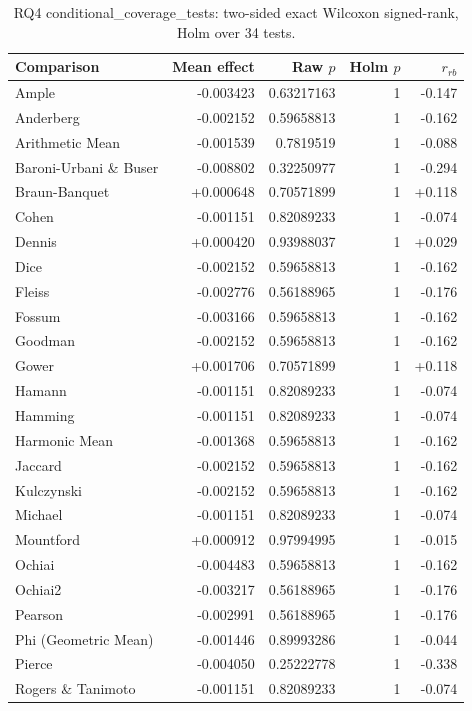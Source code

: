 \begin{longtable}{lrrrr}
\caption{RQ4 conditional\_coverage\_tests: two-sided exact Wilcoxon signed-rank, Holm over 34 tests.}\\
\toprule
Comparison & Mean effect & Raw $p$ & Holm $p$ & $r_{rb}$ \\
\midrule
Ample & -0.003423 & 0.63217163 & 1 & -0.147 \\
Anderberg & -0.002152 & 0.59658813 & 1 & -0.162 \\
Arithmetic Mean & -0.001539 & 0.7819519 & 1 & -0.088 \\
Baroni-Urbani \& Buser & -0.008802 & 0.32250977 & 1 & -0.294 \\
Braun-Banquet & +0.000648 & 0.70571899 & 1 & +0.118 \\
Cohen & -0.001151 & 0.82089233 & 1 & -0.074 \\
Dennis & +0.000420 & 0.93988037 & 1 & +0.029 \\
Dice & -0.002152 & 0.59658813 & 1 & -0.162 \\
Fleiss & -0.002776 & 0.56188965 & 1 & -0.176 \\
Fossum & -0.003166 & 0.59658813 & 1 & -0.162 \\
Goodman & -0.002152 & 0.59658813 & 1 & -0.162 \\
Gower & +0.001706 & 0.70571899 & 1 & +0.118 \\
Hamann & -0.001151 & 0.82089233 & 1 & -0.074 \\
Hamming & -0.001151 & 0.82089233 & 1 & -0.074 \\
Harmonic Mean & -0.001368 & 0.59658813 & 1 & -0.162 \\
Jaccard & -0.002152 & 0.59658813 & 1 & -0.162 \\
Kulczynski & -0.002152 & 0.59658813 & 1 & -0.162 \\
Michael & -0.001151 & 0.82089233 & 1 & -0.074 \\
Mountford & +0.000912 & 0.97994995 & 1 & -0.015 \\
Ochiai & -0.004483 & 0.59658813 & 1 & -0.162 \\
Ochiai2 & -0.003217 & 0.56188965 & 1 & -0.176 \\
Pearson & -0.002991 & 0.56188965 & 1 & -0.176 \\
Phi (Geometric Mean) & -0.001446 & 0.89993286 & 1 & -0.044 \\
Pierce & -0.004050 & 0.25222778 & 1 & -0.338 \\
Rogers \& Tanimoto & -0.001151 & 0.82089233 & 1 & -0.074 \\

\end{longtable}
